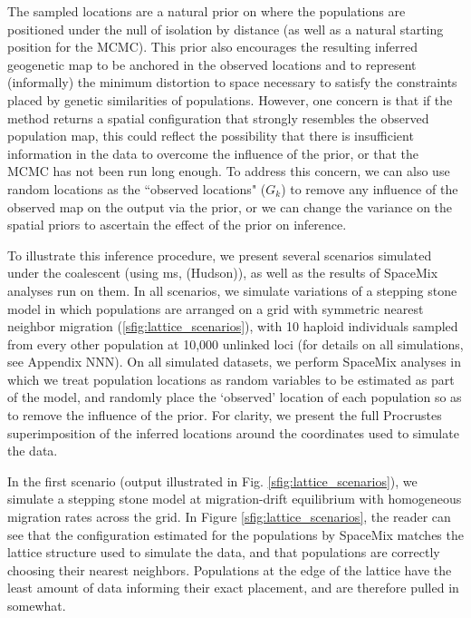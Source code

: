 \documentclass[12pt]{article}
\newcommand{\gb}[1]{{\em \color{magenta} #1}}
\begin{document}

The sampled locations are a natural prior on where the populations are positioned under the null of isolation by distance (as well as a natural starting position for the MCMC). This prior also encourages the resulting inferred geogenetic map to be anchored in the observed locations and to represent (informally) the minimum distortion to space necessary to satisfy the constraints placed by genetic similarities of populations. However, one concern is that if the method returns a spatial configuration that strongly resembles the observed population map, this could reflect the possibility that there is insufficient information in the data to overcome the influence of the prior, or that the MCMC has not been run long enough.  To address this concern, we can also use random locations as the ``observed locations" ($G_k$) to remove any influence of the observed map on the output via the prior, or we can change the variance on the spatial priors to ascertain the effect of the prior on inference.


To illustrate this inference procedure, we present several scenarios simulated under the coalescent (using \textrm{ms}, (Hudson)), as well as the results of SpaceMix analyses run on them.  In all scenarios, we simulate variations of a stepping stone model in which populations are arranged on a grid with symmetric nearest neighbor migration (\ref{sfig:lattice_scenarios}), with 10 haploid individuals sampled from every other population at 10,000 unlinked loci (for details on all simulations, see Appendix NNN). On all simulated datasets, we perform SpaceMix analyses in which we treat population locations as random variables to be estimated as part of the model, and randomly place the `observed' location of each population so as to remove the influence of the prior.  For clarity, we present the full Procrustes superimposition of the inferred locations around the coordinates used to simulate the data.

In the first scenario (output illustrated in Fig. \ref{sfig:lattice_scenarios}), we simulate a stepping stone model at migration-drift equilibrium with homogeneous migration rates across the grid. In Figure \ref{sfig:lattice_scenarios}, the reader can see that the configuration estimated for the populations by SpaceMix matches the lattice structure used to simulate the data, and that populations are correctly choosing their nearest neighbors.  Populations at the edge of the lattice have the least amount of data informing their exact placement, and are therefore pulled in somewhat.
\end{document}
